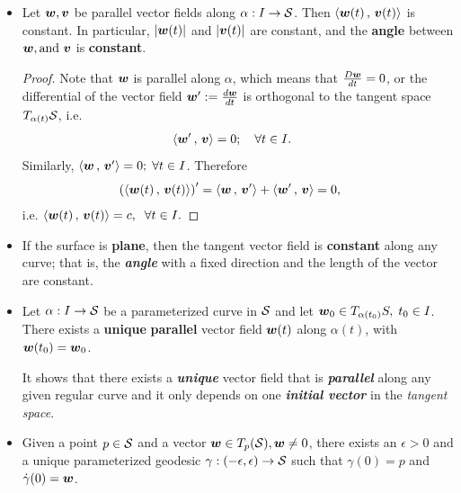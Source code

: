 \documentclass[11pt]{article}
\begin{document}
\begin{itemize}
\item 
\begin{proposition}\label{prop: para_transp}
Let $\boldsymbol{w}, \boldsymbol{v}$ be parallel vector fields along $\alpha: I\rightarrow {\mathcal S}$. Then $\left\langle \boldsymbol{w}(t)\,,\, \boldsymbol{v}(t) \right\rangle$ is constant.  In particular, $\left\lvert \boldsymbol{w}(t) \right\rvert$ and $\left\lvert \boldsymbol{v}(t) \right\rvert$ are constant, and the \textbf{angle} between $\boldsymbol{w}, \text{and }\boldsymbol{v}$ is \textbf{constant}. 
\end{proposition}
\begin{proof}
Note that $\boldsymbol{w}$ is parallel along $\alpha$, which means that $\frac{D\boldsymbol{w}}{dt} =0$, or the differential of the vector field $\boldsymbol{w}':=\frac{d\boldsymbol{w}}{dt}$ is orthogonal to the tangent space $T_{\alpha(t)}{\mathcal S}$, i.e.
\begin{align*}
\left\langle \boldsymbol{w}'\,,\, \boldsymbol{v} \right\rangle &= 0;\quad \forall t\in I.
\end{align*}
Similarly, $\left\langle \boldsymbol{w}\,,\, \boldsymbol{v}' \right\rangle = 0; \;\forall t\in I$. Therefore
\begin{align*}
\left(\left\langle \boldsymbol{w}(t)\,,\, \boldsymbol{v}(t) \right\rangle\right)' &= \left\langle \boldsymbol{w}\,,\, \boldsymbol{v}' \right\rangle+ \left\langle \boldsymbol{w}'\,,\, \boldsymbol{v} \right\rangle = 0,\;
\end{align*}
i.e. $\left\langle \boldsymbol{w}(t)\,,\, \boldsymbol{v}(t) \right\rangle = c,\;\;\forall t\in I. $ \QEDA
\end{proof}

\item If the surface is \textbf{plane}, then the tangent vector field is \textbf{constant} along any curve; that is, the \emph{\textbf{angle}} with a fixed direction and the length of the vector are constant. 


\item  \begin{proposition}\label{prop: para_transp_curv}
Let $\alpha: I\rightarrow {\mathcal S}$ be a parameterized curve in ${\mathcal S}$ and let $\boldsymbol{w}_{0} \in T_{\alpha(t_{0})}S,\; t_{0}\in I$. There exists a \textbf{unique} \textbf{parallel} vector field $\boldsymbol{w}(t)$ along $\alpha(t)$, with $\boldsymbol{w}(t_{0}) = \boldsymbol{w}_{0}$. 
\end{proposition}
It shows that there exists a \emph{\textbf{unique}} vector field that is \emph{\textbf{parallel}} along any given regular curve and it only depends on one \emph{\textbf{initial vector}} in the \emph{tangent space}. 

\item \begin{proposition}\label{prop: geo_unique}
Given a point $p\in {\mathcal S}$ and a vector $\boldsymbol{w}\in T_{p}({\mathcal S}), \boldsymbol{w}\neq 0$, there exists an $\epsilon>0$ and a unique parameterized geodesic $\gamma: (-\epsilon, \epsilon) \rightarrow {\mathcal S}$ such that $\gamma(0)=p$ and $\dot{\gamma}(0) = \boldsymbol{w}$.
\end{proposition}


\end{itemize}
\end{document}
